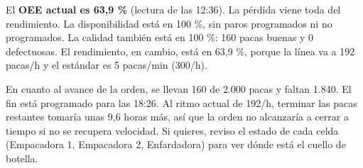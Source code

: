 \begin{singlespace}
{El \textbf{OEE actual es 63,9 \%} (lectura de las 12:36). La pérdida viene toda del rendimiento. La disponibilidad está en 100 \%, sin paros programados ni no programados. La calidad también está en 100 \%: 160 pacas buenas y 0 defectuosas. El rendimiento, en cambio, está en 63,9 \%, porque la línea va a 192 pacas/h y el estándar es 5 pacas/min (300/h).



En cuanto al avance de la orden, se llevan 160 de 2.000 pacas y faltan 1.840. El fin está programado para las 18:26. Al ritmo actual de 192/h, terminar las pacas restantes tomaría unas 9,6 horas más, así que la orden no alcanzaría a cerrar a tiempo si no se recupera velocidad. Si quieres, reviso el estado de cada celda (Empacadora 1, Empacadora 2, Enfardadora) para ver dónde está el cuello de botella.}

\end{singlespace}
